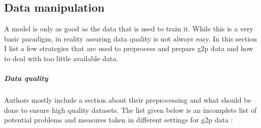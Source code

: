\subsection{Data manipulation}
A model is only as good as the data that is used to train it. While this is a very basic paradigm, in reality assuring data quality is not always easy. In this section I list a few strategies that are used to preprocess and prepare \ac{g2p} data and how to deal with too little available data. 

\subparagraph{Data quality}
\label{data_qual}
Authors mostly include a section about their preprocessing and what should be done to ensure high quality datasets. The list given below is an incomplete list of potential problems and measures taken in different settings for \ac{g2p} data \citep{Ashby-Bartley.2021}:

